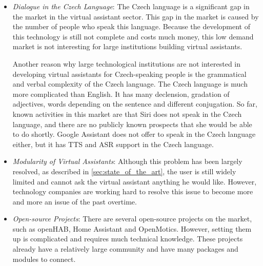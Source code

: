 \begin{itemize}
    \item \textit{Dialogue in the Czech Language}:
    The Czech language is a significant gap in the market in the virtual assistant sector. This gap in the market is caused by the number of people who speak this language. Because the development of this technology is still not complete and costs much money, this low demand market is not interesting for large institutions building virtual assistants.

    Another reason why large technological institutions are not interested in developing virtual assistants for Czech-speaking people is the grammatical and verbal complexity of the Czech language. The Czech language is much more complicated than English. It has many declension, gradation of adjectives, words depending on the sentence and different conjugation.
\newpage
    So far, known activities in this market are that Siri does not speak in the Czech language, and there are no publicly known prospects that she would be able to do shortly. Google Assistant does not offer to speak in the Czech language either, but it has TTS and ASR support in the Czech language.
    \item \textit{Modularity of Virtual Assistants}:
    Although this problem has been largely resolved, as described in \cref{sec:state_of_the_art}, the user is still widely limited and cannot ask the virtual assistant anything he would like. However, technology companies are working hard to resolve this issue to become more and more an issue of the past overtime.
    \item \textit{Open-source Projects}:
    There are several open-source projects on the market, such as openHAB, Home Assistant and OpenMotics. However, setting them up is complicated and requires much technical knowledge. These projects already have a relatively large community and have many packages and modules to connect.
\end{itemize}

